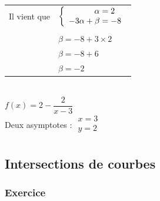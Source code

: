\begin{enumerate}
\begin{tabular}{rl}
Il vient que & $\left\lbrace \begin{array}{r@{\;=\;}l}
                              \alpha   &  2 \\
                        -3\alpha + \beta & -8 \\
                            \end{array} \right.$ \\
             & \\              
             & $ \beta = -8 +3 \times 2$ \\               
             & $ \beta = -8 + 6 $ \\      
             & $ \beta = -2$ \\      
\end{tabular}\\

$f(x) = 2 - \dfrac{2}{x - 3} $\\

Deux asymptotes : $\begin{array}{l}
                    x = 3 \\
                    y = 2 \\
                   \end{array}$
\end{enumerate}


\samepage

\newpage

\subsection{Intersections de courbes}




\subsubsection{Exercice }

